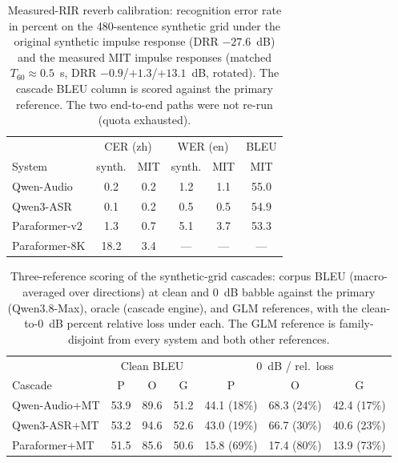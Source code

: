 \begin{table}[t]
\centering
\caption{Measured-RIR reverb calibration: recognition error rate in percent
on the 480-sentence synthetic grid under the original synthetic impulse
response (DRR $-27.6$~dB) and the measured MIT impulse responses (matched
$T_{60} \approx 0.5$~s, DRR $-0.9$/$+1.3$/$+13.1$~dB, rotated). The
cascade BLEU column is scored against the primary reference. The two
end-to-end paths were not re-run (quota exhausted).}
\label{tab:revmit}
\small
\begin{tabular}{lccccc}
\toprule
 & \multicolumn{2}{c}{CER (zh)} & \multicolumn{2}{c}{WER (en)} & BLEU \\
System & synth. & MIT & synth. & MIT & MIT \\
\midrule
Qwen-Audio & 0.2 & 0.2 & 1.2 & 1.1 & 55.0 \\
Qwen3-ASR & 0.1 & 0.2 & 0.5 & 0.5 & 54.9 \\
Paraformer-v2 & 1.3 & 0.7 & 5.1 & 3.7 & 53.3 \\
Paraformer-8K & 18.2 & 3.4 & --- & --- & --- \\
\bottomrule
\end{tabular}
\end{table}

\begin{table}[t]
\centering
\caption{Three-reference scoring of the synthetic-grid cascades: corpus
BLEU (macro-averaged over directions) at clean and 0~dB babble against the
primary (Qwen3.8-Max), oracle (cascade engine), and GLM references, with
the clean-to-0~dB percent relative loss under each. The GLM reference is
family-disjoint from every system and both other references.}
\label{tab:threeref}
\small
\begin{tabular}{lcccccc}
\toprule
 & \multicolumn{3}{c}{Clean BLEU} & \multicolumn{3}{c}{0~dB / rel.\ loss} \\
Cascade & P & O & G & P & O & G \\
\midrule
Qwen-Audio+MT & 53.9 & 89.6 & 51.2 & 44.1 (18\%) & 68.3 (24\%) & 42.4 (17\%) \\
Qwen3-ASR+MT & 53.2 & 94.6 & 52.6 & 43.0 (19\%) & 66.7 (30\%) & 40.6 (23\%) \\
Paraformer+MT & 51.5 & 85.6 & 50.6 & 15.8 (69\%) & 17.4 (80\%) & 13.9 (73\%) \\
\bottomrule
\end{tabular}
\end{table}
